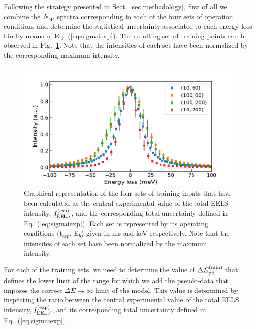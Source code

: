 Following the strategy presented in Sect.~\ref{sec:methodology}, first of all we combine the $N_{\rm sp}$ spectra
corresponding to each of the four sets of operation conditions and determine the statistical uncertainty
associated to each energy loss bin by means of Eq.~(\ref{eq:sigmaiexp}).
%
The resulting set of training points can be observed in Fig.~\ref{fig:training_points_vacuum}. 
%
Note that the intensities of each set have been normalized by the corresponding maximum intensity.

\begin{figure}[H]
    \centering
    \includegraphics[width=120mm]{plots/training_points_vacuum.pdf}
    \caption{Graphical representation of the four sets of training inputs
    that have been calculated as the central experimental value of the total
      EELS intensity, $I_{{\rm EEL},i}^{(\rm exp)}$, and the corresponding
      total uncertainty defined in Eq.~(\ref{eq:sigmaiexp}).
      Each set is represented by its operating conditions (t$_{exp}$, E$_b$)
      given in ms and keV respectively.
      Note that the intensites of each set have been normalized
      by the maximum intensity.
      }
\label{fig:training_points_vacuum}
\end{figure}

For each of the training sets, we need to determine the value of $\Delta E_{\rm pd}^{\rm (min)}$
that defines the lower limit of the range for which we add the pseudo-data
that imposes the correct $\Delta E \to \infty$ limit of the model.
%
This value is determined
by inspecting the ratio between the central experimental value of the total
EELS intensity, $I_{{\rm EEL},i}^{(\rm exp)}$, and its corresponding
total uncertainty defined in Eq.~(\ref{eq:sigmaiexp}).

